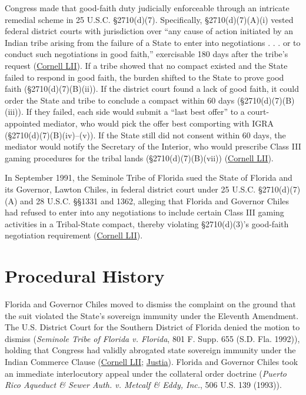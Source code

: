 \documentclass[12pt]{article}
\begin{document}
Congress made that good-faith duty judicially enforceable through an intricate remedial scheme in 25 U.S.C. \S 2710(d)(7). Specifically, \S 2710(d)(7)(A)(i) vested federal district courts with jurisdiction over ``any cause of action initiated by an Indian tribe arising from the failure of a State to enter into negotiations . . . or to conduct such negotiations in good faith,'' exercisable 180 days after the tribe's request (\href{https://www.law.cornell.edu/supct/html/94-12.ZO.html}{Cornell LII}). If a tribe showed that no compact existed and the State failed to respond in good faith, the burden shifted to the State to prove good faith (\S 2710(d)(7)(B)(ii)). If the district court found a lack of good faith, it could order the State and tribe to conclude a compact within 60 days (\S 2710(d)(7)(B)(iii)). If they failed, each side would submit a ``last best offer'' to a court-appointed mediator, who would pick the offer best comporting with IGRA (\S 2710(d)(7)(B)(iv)--(v)). If the State still did not consent within 60 days, the mediator would notify the Secretary of the Interior, who would prescribe Class III gaming procedures for the tribal lands (\S 2710(d)(7)(B)(vii)) (\href{https://www.law.cornell.edu/supct/html/94-12.ZO.html}{Cornell LII}).

In September 1991, the Seminole Tribe of Florida sued the State of Florida and its Governor, Lawton Chiles, in federal district court under 25 U.S.C. \S 2710(d)(7)(A) and 28 U.S.C. \S\S 1331 and 1362, alleging that Florida and Governor Chiles had refused to enter into any negotiations to include certain Class III gaming activities in a Tribal-State compact, thereby violating \S 2710(d)(3)'s good-faith negotiation requirement (\href{https://www.law.cornell.edu/supct/html/94-12.ZO.html}{Cornell LII}).

\section{Procedural History}

Florida and Governor Chiles moved to dismiss the complaint on the ground that the suit violated the State's sovereign immunity under the Eleventh Amendment. The U.S. District Court for the Southern District of Florida denied the motion to dismiss (\textit{Seminole Tribe of Florida v. Florida}, 801 F. Supp. 655 (S.D. Fla. 1992)), holding that Congress had validly abrogated state sovereign immunity under the Indian Commerce Clause (\href{https://www.law.cornell.edu/supct/html/94-12.ZO.html}{Cornell LII}; \href{https://supreme.justia.com/cases/federal/us/517/44/}{Justia}). Florida and Governor Chiles took an immediate interlocutory appeal under the collateral order doctrine (\textit{Puerto Rico Aqueduct \& Sewer Auth. v. Metcalf \& Eddy, Inc.}, 506 U.S. 139 (1993)).
\end{document}

